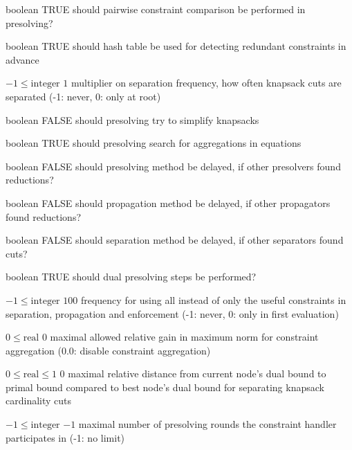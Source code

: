 %
{boolean}%
{TRUE}%
{should pairwise constraint comparison be performed in presolving?}%
{}

%
{boolean}%
{TRUE}%
{should hash table be used for detecting redundant constraints in advance}%
{}

%
{$-1\leq\textrm{integer}$}%
{$1$}%
{multiplier on separation frequency, how often knapsack cuts are separated (-1: never, 0: only at root)}%
{}

%
{boolean}%
{FALSE}%
{should presolving try to simplify knapsacks}%
{}

%
{boolean}%
{TRUE}%
{should presolving search for aggregations in equations}%
{}

%
{boolean}%
{FALSE}%
{should presolving method be delayed, if other presolvers found reductions?}%
{}

%
{boolean}%
{FALSE}%
{should propagation method be delayed, if other propagators found reductions?}%
{}

%
{boolean}%
{FALSE}%
{should separation method be delayed, if other separators found cuts?}%
{}

%
{boolean}%
{TRUE}%
{should dual presolving steps be performed?}%
{}

%
{$-1\leq\textrm{integer}$}%
{$100$}%
{frequency for using all instead of only the useful constraints in separation, propagation and enforcement (-1: never, 0: only in first evaluation)}%
{}

%
{$0\leq\textrm{real}$}%
{$0$}%
{maximal allowed relative gain in maximum norm for constraint aggregation (0.0: disable constraint aggregation)}%
{}

%
{$0\leq\textrm{real}\leq1$}%
{$0$}%
{maximal relative distance from current node's dual bound to primal bound compared to best node's dual bound for separating knapsack cardinality cuts}%
{}

%
{$-1\leq\textrm{integer}$}%
{$-1$}%
{maximal number of presolving rounds the constraint handler participates in (-1: no limit)}%
{}

